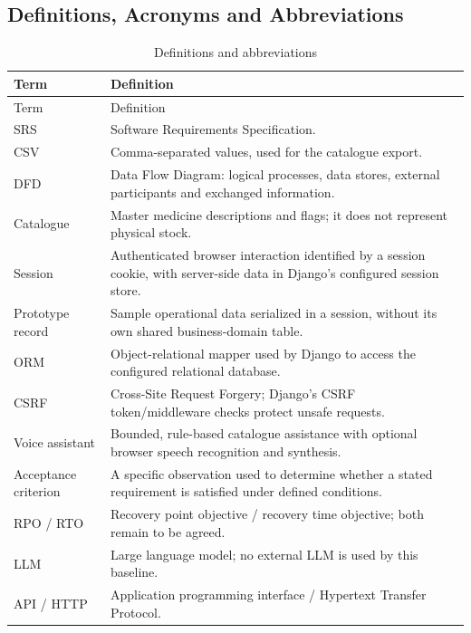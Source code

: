 \documentclass[11pt,a4paper]{article}
\begin{document}
\subsection{Definitions, Acronyms and Abbreviations}\label{sec:terms}
\begin{longtable}{@{}L{32mm}L{124mm}@{}}
\caption{Definitions and abbreviations}\\
\toprule Term & Definition\\\midrule\endfirsthead
\toprule Term & Definition\\\midrule\endhead
\bottomrule\endfoot
SRS & Software Requirements Specification.\\
CSV & Comma-separated values, used for the catalogue export.\\
DFD & Data Flow Diagram: logical processes, data stores, external participants and exchanged information.\\
Catalogue & Master medicine descriptions and flags; it does not represent physical stock.\\
Session & Authenticated browser interaction identified by a session cookie, with server-side data in Django's configured session store.\\
Prototype record & Sample operational data serialized in a session, without its own shared business-domain table.\\
ORM & Object-relational mapper used by Django to access the configured relational database.\\
CSRF & Cross-Site Request Forgery; Django's CSRF token/middleware checks protect unsafe requests.\\
Voice assistant & Bounded, rule-based catalogue assistance with optional browser speech recognition and synthesis.\\
Acceptance criterion & A specific observation used to determine whether a stated requirement is satisfied under defined conditions.\\
RPO / RTO & Recovery point objective / recovery time objective; both remain to be agreed.\\
LLM & Large language model; no external LLM is used by this baseline.\\
API / HTTP & Application programming interface / Hypertext Transfer Protocol.\\
\end{longtable}
\end{document}
